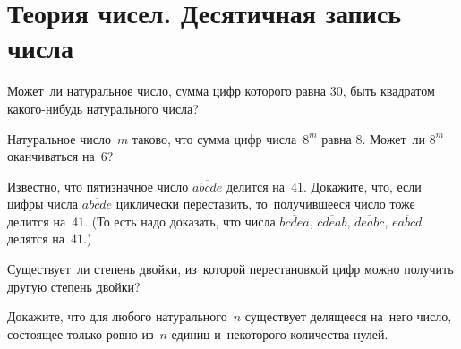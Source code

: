 
\section*{Теория чисел. Десятичная запись числа}


\begin{problems}

\item
Может~ли натуральное число, сумма цифр которого равна $30$, быть квадратом
какого-нибудь натурального числа?

\item
Натуральное число~$m$ таково, что сумма цифр числа~$8^{m}$ равна $8$.
Может~ли $8^{m}$ оканчиваться на~$6$?

\item
Известно, что пятизначное число $\overline{abcde}$ делится на~$41$.
Докажите, что, если цифры числа $\overline{abcde}$ циклически переставить,
то~получившееся число тоже делится на~$41$.
(То есть надо доказать, что числа $\overline{bcdea}$, $\overline{cdeab}$,
$\overline{deabc}$, $\overline{eabcd}$ делятся на~$41$.)


\item
Существует~ли степень двойки, из~которой перестановкой цифр можно получить
другую степень двойки?


\item
Докажите, что для любого натурального~$n$ существует делящееся на~него число,
состоящее только ровно из~$n$ единиц и~некоторого количества нулей.




\end{problems}
